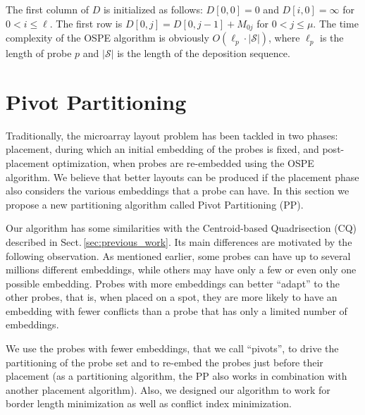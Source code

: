\documentclass{llncs}
\begin{document}
The first column of $D$ is initialized as follows: $D[0,0] = 0$ and $D[i,0] =
\infty$ for $0 < i \leq \ell$. The first row is $D[0,j] = D[0,j-1]+M_{0j}$ for
$0<j\leq\mu$.
The time complexity of the OSPE algorithm is obviously $O(\ell_p \cdot
|\mathcal{S}|)$, where $\ell_p$ is the length of probe $p$ and $|\mathcal{S}|$
is the length of the deposition sequence.


\section{Pivot Partitioning}
\label{sec:pivotpart}

Traditionally, the microarray layout problem has been tackled in two phases:
placement, during which an initial embedding of the probes is fixed, and
post-placement optimization, when probes are re-embedded using the OSPE algorithm.
We believe that better layouts can be produced if the placement phase also considers
the various embeddings that a probe can have. In this section we propose a new
partitioning algorithm called Pivot Partitioning (PP).

Our algorithm
has some similarities with the Centroid-based Quadrisection (CQ) described
in Sect.\,\ref{sec:previous_work}.
Its main differences are motivated by the following observation.
As mentioned earlier, some probes can have up to several millions different
embeddings, while others may have only a few or even only one possible embedding.
Probes with more embeddings can better
``adapt'' to the other probes, that is, when placed on a spot, they are more likely
to have an embedding with fewer conflicts than a probe that has
only a limited number of embeddings.

We use the probes with fewer embeddings, that we call ``pivots'', to drive the
partitioning of the probe set and to re-embed the probes just before their
placement (as a partitioning algorithm, the PP also works in combination with
another placement algorithm). Also, we designed our algorithm to work for border
length minimization as well as conflict index minimization.
\end{document}
